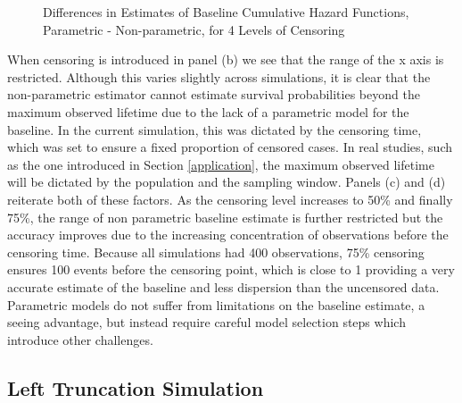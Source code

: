 \documentclass[12pt,letterpaper]{article}
\begin{document}
\begin{figure}[h!]
	\centering
	\quad
	\quad
	\quad
	\caption{Differences in Estimates of Baseline Cumulative Hazard Functions, Parametric - Non-parametric, for 4 Levels of Censoring}
	\label{fig:rightdiff}
\end{figure}
When censoring is introduced in panel (b) we see that the range of the x axis is restricted.  Although this varies slightly across simulations, it is clear that the non-parametric estimator cannot estimate survival probabilities beyond the maximum observed lifetime due to the lack of a parametric model for the baseline.  In the current simulation, this was dictated by the censoring time, which was set to ensure a fixed proportion of censored cases.  In real studies, such as the one introduced in Section \ref{application}, the maximum observed lifetime will be dictated by the population and the sampling window. Panels (c) and (d) reiterate both of these factors. As the censoring level increases to 50\% and finally 75\%, the range of non parametric baseline estimate is further restricted but the accuracy improves due to the increasing concentration of observations before the censoring time.  Because all simulations had 400 observations, 75\% censoring ensures 100 events before the censoring point, which is close to 1 providing a very accurate estimate of the baseline and less dispersion than the uncensored data.  Parametric models do not suffer from limitations on the baseline estimate, a seeing advantage, but instead require careful model selection steps which introduce other challenges.


\subsection{Left Truncation Simulation}
\end{document}
